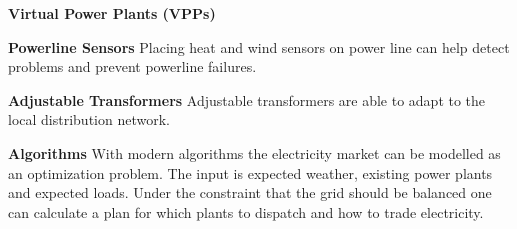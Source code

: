\begin{labeling}{\textbf{Virtual Power Plants (VPPs)}}
    \item [\textbf{Powerline Sensors}]
    Placing heat and wind sensors on power line can help detect problems and prevent powerline failures.


    \item [\textbf{Adjustable Transformers}]
    Adjustable transformers are able to adapt to the local distribution network.


    \item [\textbf{Algorithms}]
    With modern algorithms the electricity market can be modelled as an optimization problem. The input is expected weather, existing power plants and expected loads. Under the constraint that the grid should be balanced one can calculate a plan for which plants to dispatch and how to trade electricity.

\end{labeling}

